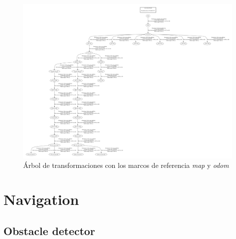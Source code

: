 \documentclass[a4paper,usenames,dvipsnames,svgnames,table]{book}
\begin{document}
\begin{figure}[H]
\begin{center}
\includegraphics[scale=0.2, angle=90]{Figures/Software/kinematic_tree/frames.pdf}
\end{center}
\caption{Árbol de transformaciones con los marcos de referencia \textit{map} y \textit{odom}}
\label{fig:URDF:Frames}
\end{figure}

\section{Navigation}

\subsection{Obstacle detector}
\end{document}
